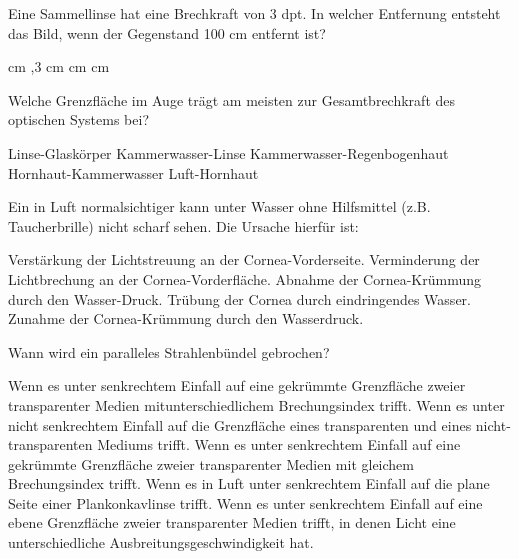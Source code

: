 \documentclass[11pt]{exam}
\begin{document}
\setlength{\voffset}{-0.5in}
\setlength{\headsep}{5pt}

\hspace{2mm}
 \hspace{5mm}
\vspace{4mm}

\begin{questions}

\question Eine Sammellinse hat eine Brechkraft von 3 dpt. In welcher Entfernung entsteht das Bild, wenn der Gegenstand 100 cm entfernt ist?

\begin{choices}
	 cm
	,3 cm
	 cm
	\choice 150cm
	 cm
\end{choices}

\vspace{3mm}\question Welche Grenzfläche im Auge trägt am meisten zur Gesamtbrechkraft des optischen Systems bei?

\begin{choices}
	\choice Linse-Glaskörper
	\choice Kammerwasser-Linse
	\choice Kammerwasser-Regenbogenhaut
	\choice Hornhaut-Kammerwasser
	\choice Luft-Hornhaut
\end{choices}

\vspace{3mm}\question Ein in Luft normalsichtiger kann unter Wasser ohne Hilfsmittel (z.B. Taucherbrille) nicht scharf sehen. Die Ursache hierfür ist:

\begin{choices}
	\choice Verstärkung der Lichtstreuung an der Cornea-Vorderseite.
	\choice Verminderung der Lichtbrechung an der Cornea-Vorderfläche.
	\choice Abnahme der Cornea-Krümmung durch den Wasser-Druck.
	\choice Trübung der Cornea durch eindringendes Wasser.
	\choice Zunahme der Cornea-Krümmung durch den Wasserdruck.
\end{choices}

\vspace{3mm}\question Wann wird ein paralleles Strahlenbündel gebrochen?

\begin{choices}
	\choice Wenn es unter senkrechtem Einfall auf eine gekrümmte Grenzfläche zweier transparenter Medien mitunterschiedlichem Brechungsindex trifft.
	\choice Wenn es unter nicht senkrechtem Einfall auf die Grenzfläche eines transparenten und eines nicht-transparenten Mediums trifft.
	\choice Wenn es unter senkrechtem Einfall auf eine gekrümmte Grenzfläche zweier transparenter Medien mit gleichem Brechungsindex trifft.
	\choice Wenn es in Luft unter senkrechtem Einfall auf die plane Seite einer Plankonkavlinse trifft.
	\choice Wenn es unter senkrechtem Einfall auf eine ebene Grenzfläche zweier transparenter Medien trifft, in denen Licht eine unterschiedliche Ausbreitungsgeschwindigkeit hat.
\end{choices}


\end{questions}
\end{document}

